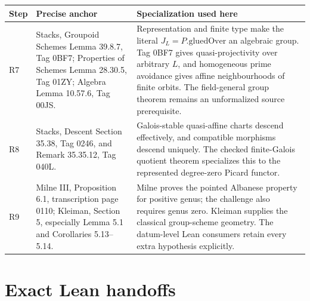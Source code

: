 \begin{center}
\begin{tabular}{p{}p{}p{}}
\textbf{Step} & \textbf{Precise anchor} & \textbf{Specialization used here}\\ \hline
R7 & Stacks, Groupoid Schemes Lemma 39.8.7, Tag 0BF7; Properties of Schemes
Lemma 28.30.5, Tag 01ZY; Algebra Lemma 10.57.6, Tag 00JS. & Representation
and finite type make the literal \(J_L=P.\mathrm{gluedOver}\) an algebraic
group.  Tag 0BF7 gives quasi-projectivity over arbitrary \(L\), and
homogeneous prime avoidance gives affine neighbourhoods of finite orbits.
The field-general group theorem remains an unformalized source prerequisite.\\
R8 & Stacks, Descent Section 35.38, Tag 0246, and Remark 35.35.12, Tag 040L. &
Galois-stable quasi-affine charts descend effectively, and compatible
morphisms descend uniquely.  The checked finite-Galois quotient theorem
specializes this to the represented degree-zero Picard functor.\\
R9 & Milne III, Proposition 6.1, transcription page 0110; Kleiman, Section 5,
especially Lemma 5.1 and Corollaries 5.13--5.14. & Milne proves the pointed
Albanese property for positive genus; the challenge also requires genus zero.
Kleiman supplies the classical group-scheme geometry.  The datum-level Lean
consumers retain every extra hypothesis explicitly.\\
\end{tabular}
\end{center}

\section{Exact Lean handoffs}
\label{route-app-lean-handoff}


